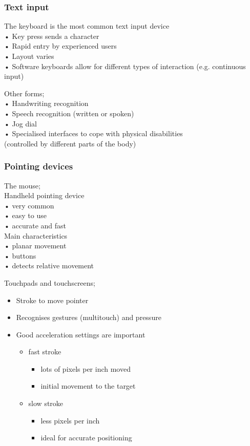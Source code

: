 \documentclass[]{project_plan}
\begin{document}
\subsubsection{Text input}
The keyboard is the most common text input device\\
• Key press sends a character\\
• Rapid entry by experienced users\\
• Layout varies\\
• Software keyboards allow for different types of interaction (e.g. continuous input)

Other forms;\\
• Handwriting recognition\\
• Speech recognition (written or spoken)\\
• Jog dial\\
• Specialised interfaces to cope with physical disabilities\\
(controlled by different parts of the body)

\subsubsection{Pointing devices}
The mouse;\\
Handheld pointing device\\
• very common\\
• easy to use\\
• accurate and fast\\
Main characteristics\\
• planar movement\\
• buttons\\
• detects relative movement

Touchpads and touchscreens;
\begin{itemize}
  \item Stroke to move pointer
  \item Recognises gestures (multitouch) and pressure
  \item Good acceleration settings are important \begin{itemize}
          \item fast stroke \begin{itemize}
                  \item lots of pixels per inch moved
                  \item initial movement to the target
                \end{itemize}
          \item slow stroke \begin{itemize}
                  \item less pixels per inch
                  \item ideal for accurate positioning
                \end{itemize}
        \end{itemize}
\end{itemize}
\end{document}
